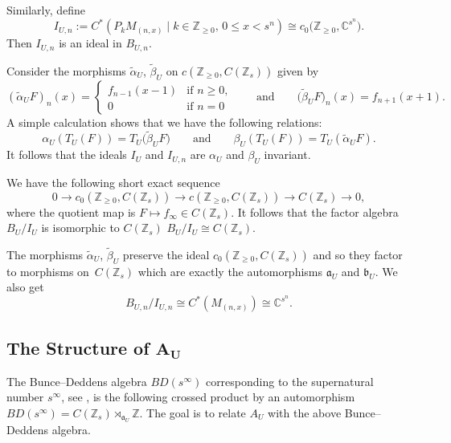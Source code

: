 \documentclass[pdftex]{sigma}
\newcommand{\C}{{\mathbb C}}
\newcommand{\Z}{{\mathbb Z}}
\numberwithin{equation}{section}
\begin{document}
Similarly, define
\[
I_{U,n}:= C^*(P_kM_{(n,x)} \mid k\in \Z_{\ge 0}, \, 0\le x < s^n) \cong c_0\bigl(\Z_{\ge 0},\C^{s^n}\bigr).
\]
Then $I_{U,n}$ is an ideal in $B_{U,n}$.

Consider the morphisms $\tilde{\alpha}_U$, $\tilde{\beta}_U$ on $c(\Z_{\ge0}, C(\Z_s))$ given by
\begin{equation*}
(\tilde{\alpha}_UF)_n(x) =
\begin{cases}
f_{n-1}(x-1) &\textrm{if }n\ge0, \\
0 &\textrm{if }n=0
\end{cases}\qquad\text{and}\qquad \bigl(\tilde{\beta}_UF\bigr)_n(x) = f_{n+1}(x+1) .
\end{equation*}
A simple calculation shows that we have the following relations:
\begin{equation*}
\alpha_U(T_U(F))=T_U\bigl(\tilde{\beta}_UF\bigr)\qquad\text{and}\qquad \beta_U(T_U(F))=T_U(\tilde{\alpha}_UF) .
\end{equation*}
It follows that the ideals $I_U$ and $I_{U,n}$ are $\alpha_U$ and $\beta_U$ invariant.

We have the following short exact sequence
\begin{equation*}
0\to c_0(\Z_{\ge0}, C(\Z_s))\to c(\Z_{\ge0}, C(\Z_s))\to C(\Z_s)\to 0,
\end{equation*}
where the quotient map is $F\mapsto f_\infty\in C(\Z_s)$.
It follows that the factor algebra $B_U/I_U$ is isomorphic to $C(\Z_s)$
$
B_U/I_U\cong C(\Z_s)$.

The morphisms $\tilde{\alpha}_U$, $\tilde{\beta}_U$ preserve the ideal $c_0(\Z_{\ge0}, C(\Z_s))$ and so they factor to morphisms on~$C(\Z_s)$ which are exactly the automorphisms $\mathfrak{a}_U$ and $\mathfrak{b}_U$. We also get
\[
B_{U,n}/I_{U,n} \cong C^*(M_{(n,x)}) \cong \C^{s^n}.
\]

\subsection[The Structure of A\_U]{The Structure of $\boldsymbol{A_U}$}
The Bunce--Deddens algebra $BD(s^\infty)$ corresponding to the supernatural number $s^\infty$, see \cite{BD1,BD2,KMP2}, is the following crossed product by an automorphism
$BD(s^\infty) = C(\Z_s)\rtimes_{\mathfrak{a}_U}\Z $.
The goal is to relate $A_U$ with the above Bunce--Deddens algebra.
\end{document}
